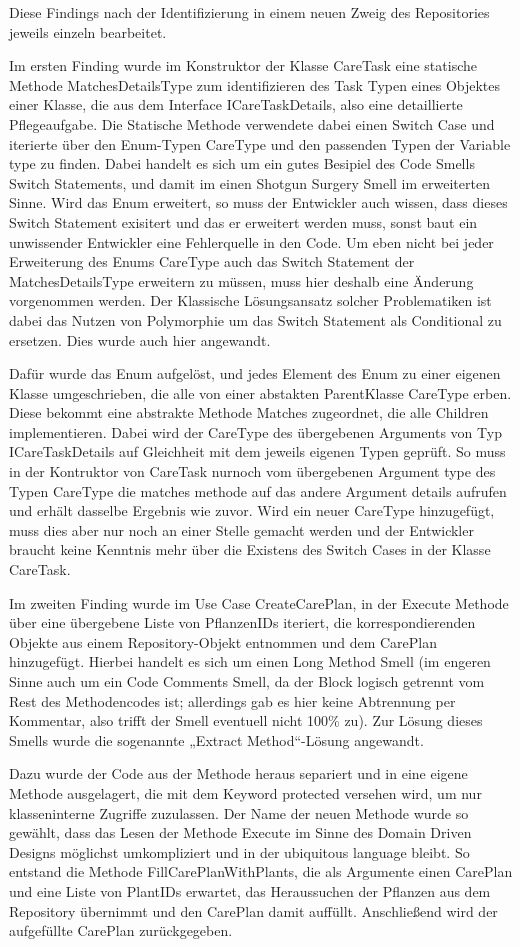 Diese Findings nach der Identifizierung in einem neuen Zweig des Repositories jeweils einzeln bearbeitet.
\par
Im ersten Finding wurde im Konstruktor der Klasse CareTask eine statische Methode MatchesDetailsType zum identifizieren des Task Typen eines Objektes einer Klasse, die aus dem Interface ICareTaskDetails, also eine detaillierte Pflegeaufgabe. Die Statische Methode verwendete dabei einen Switch Case und iterierte über den Enum-Typen CareType und den passenden Typen der Variable type zu finden. Dabei handelt es sich um ein gutes Besipiel des Code Smells Switch Statements, und damit im einen Shotgun Surgery Smell im erweiterten Sinne. Wird das Enum erweitert, so muss der Entwickler auch wissen, dass dieses Switch Statement exisitert und das er erweitert werden muss, sonst baut ein unwissender Entwickler eine Fehlerquelle in den Code. Um eben nicht bei jeder Erweiterung des Enums CareType auch das Switch Statement der MatchesDetailsType erweitern zu müssen, muss hier deshalb eine Änderung vorgenommen werden.  Der Klassische Lösungsansatz solcher Problematiken ist dabei das Nutzen von Polymorphie um das Switch Statement als Conditional zu ersetzen. Dies wurde auch hier angewandt. 
\par
Dafür wurde das Enum aufgelöst, und jedes Element des Enum zu einer eigenen Klasse umgeschrieben, die alle von einer abstakten ParentKlasse CareType erben. Diese bekommt eine abstrakte Methode Matches zugeordnet, die alle Children implementieren. Dabei wird der CareType des übergebenen Arguments von Typ ICareTaskDetails auf Gleichheit mit dem jeweils eigenen Typen geprüft. So muss in der Kontruktor von CareTask nurnoch vom übergebenen Argument type des Typen CareType die matches methode auf das andere Argument details aufrufen und erhält dasselbe Ergebnis wie zuvor. Wird ein neuer CareType hinzugefügt, muss dies aber nur noch an einer Stelle gemacht werden und der Entwickler braucht keine Kenntnis mehr über die Existens des Switch Cases in der Klasse CareTask.

Im zweiten Finding wurde im Use Case CreateCarePlan, in der Execute Methode über eine übergebene Liste von PflanzenIDs iteriert, die korrespondierenden Objekte aus einem Repository-Objekt entnommen und dem CarePlan hinzugefügt. Hierbei handelt es sich um einen Long Method Smell (im engeren Sinne auch um ein Code Comments Smell, da der Block logisch getrennt vom Rest des Methodencodes ist; allerdings gab es hier keine Abtrennung per Kommentar, also trifft der Smell eventuell nicht 100\% zu). Zur Lösung dieses Smells wurde die sogenannte „Extract Method“-Lösung angewandt. 
\par
Dazu wurde der Code aus der Methode heraus separiert und in eine eigene Methode ausgelagert, die mit dem Keyword protected versehen wird, um nur klasseninterne Zugriffe zuzulassen. Der Name der neuen Methode wurde so gewählt, dass das Lesen der Methode Execute im Sinne des Domain Driven Designs möglichst umkompliziert und in der ubiquitous language bleibt. So entstand die Methode FillCarePlanWithPlants, die als Argumente einen CarePlan und eine Liste von PlantIDs erwartet, das Heraussuchen der Pflanzen aus dem Repository übernimmt und den CarePlan damit auffüllt. Anschließend wird der aufgefüllte CarePlan zurückgegeben. 

